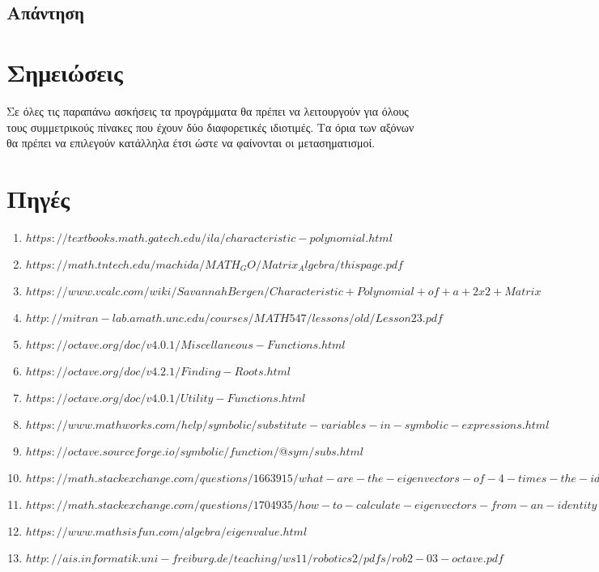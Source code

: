 \documentclass[a4paper,12pt]{article}
\begin{document}
\subsection{Απάντηση}
\newpage\section{Σημειώσεις}
Σε όλες τις παραπάνω ασκήσεις τα προγράμματα θα πρέπει να λειτουργούν για όλους τους συμμετρικούς πίνακες
που έχουν δύο διαφορετικές ιδιοτιμές. Τα όρια των αξόνων θα πρέπει να επιλεγούν κατάλληλα έτσι ώστε να
φαίνονται οι μετασηματισμοί.
\newpage\section{Πηγές}
\begin{enumerate}
    \item $https://textbooks.math.gatech.edu/ila/characteristic-polynomial.html$
    \item $https://math.tntech.edu/machida/MATH_GO/Matrix_Algebra/thispage.pdf$
    \item $https://www.vcalc.com/wiki/SavannahBergen/Characteristic+Polynomial+of+a+2x2+Matrix$
    \item $http://mitran-lab.amath.unc.edu/courses/MATH547/lessons/old/Lesson23.pdf$
    \item $https://octave.org/doc/v4.0.1/Miscellaneous-Functions.html$
    \item $https://octave.org/doc/v4.2.1/Finding-Roots.html$
    \item $https://octave.org/doc/v4.0.1/Utility-Functions.html$
    \item $https://www.mathworks.com/help/symbolic/substitute-variables-in-symbolic-expressions.html$
    \item $https://octave.sourceforge.io/symbolic/function/@sym/subs.html$
    \item $https://math.stackexchange.com/questions/1663915/what-are-the-eigenvectors-of-4-times-the-identity-matrix$
    \item $https://math.stackexchange.com/questions/1704935/how-to-calculate-eigenvectors-from-an-identity-matrix-with-eigenvalue-1$
    \item $https://www.mathsisfun.com/algebra/eigenvalue.html$
    \item $http://ais.informatik.uni-freiburg.de/teaching/ws11/robotics2/pdfs/rob2-03-octave.pdf$
\end{enumerate}
\end{document}
